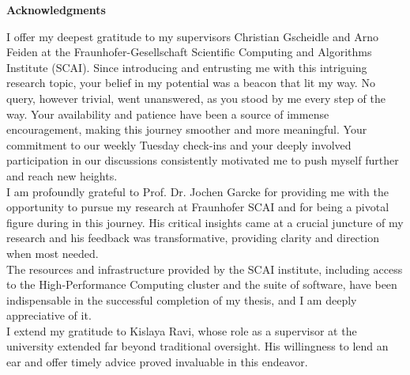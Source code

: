 \clearemptydoublepage
{}
{}

\vspace*{2cm}

\begin{center}
{\Large \textbf{Acknowledgments}}
\end{center}

\vspace{1cm}

I offer my deepest gratitude to my supervisors Christian Gscheidle and Arno Feiden at the Fraunhofer-Gesellschaft Scientific Computing and Algorithms Institute (SCAI). Since introducing and entrusting me with this intriguing research topic, your belief in my potential was a beacon that lit my way. No query, however trivial, went unanswered, as you stood by me every step of the way. Your availability and patience have been a source of immense encouragement, making this journey smoother and more meaningful. Your commitment to our weekly Tuesday check-ins and your deeply involved participation in our discussions consistently motivated me to push myself further and reach new heights. \\

I am profoundly grateful to Prof. Dr. Jochen Garcke for providing me with the opportunity to pursue my research at Fraunhofer SCAI and for being a pivotal figure during in this journey. His critical insights came at a crucial juncture of my research and his feedback was transformative, providing clarity and direction when most needed. \\

The resources and infrastructure provided by the SCAI institute, including access to the High-Performance Computing cluster and the suite of software, have been indispensable in the successful completion of my thesis, and I am deeply appreciative of it. \\

I extend my gratitude to Kislaya Ravi, whose role as a supervisor at the university extended far beyond traditional oversight. His willingness to lend an ear and offer timely advice proved invaluable in this endeavor. \\

